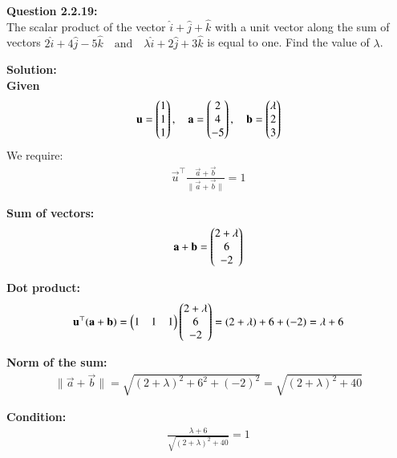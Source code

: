 \documentclass[journal]{IEEEtran}
\begin{document}



\textbf{Question 2.2.19:} \\
\textbf{} The scalar product of the vector $\hat{i} + \hat{j} + \hat{k}$ with a unit vector along the sum of vectors 
$2\hat{i} + 4\hat{j} - 5\hat{k} \quad \text{and} \quad \lambda \hat{i} + 2\hat{j} + 3\hat{k}$ is equal to one. Find the value of $\lambda$.


\textbf{Solution:}\\
 \textbf{Given}  
\begin{align}
\mathbf u = \begin{pmatrix}1\\1\\1\end{pmatrix}, \quad 
\mathbf a = \begin{pmatrix}2\\4\\-5\end{pmatrix}, \quad 
\mathbf b = \begin{pmatrix}\lambda\\2\\3\end{pmatrix}
\end{align}
We require:  
\begin{align}
\vec u^\top \frac{\vec a+\vec b}{\|\vec a+\vec b\|} = 1
\end{align}

\textbf{Sum of vectors:}
\begin{align}
\mathbf a + \mathbf b = \begin{pmatrix}2+\lambda\\6\\-2\end{pmatrix}
\end{align}

\textbf{Dot product:}
\begin{align}
\mathbf u^\top(\mathbf a+\mathbf b) = \begin{pmatrix}1 & 1 & 1\end{pmatrix}\begin{pmatrix}2+\lambda\\6\\-2\end{pmatrix} 
= (2+\lambda)+6+(-2) = \lambda+6
\end{align}

\textbf{Norm of the sum:}
\begin{align}
\|\vec a+\vec b\| = \sqrt{(2+\lambda)^2+6^2+(-2)^2}
= \sqrt{(2+\lambda)^2+40}
\end{align}

 \textbf{Condition:}
\begin{align}
\frac{\lambda+6}{\sqrt{(2+\lambda)^2+40}} = 1
\end{align}
\end{document}
